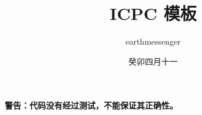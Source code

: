 \documentclass{article}
\title{ICPC 模板}
\author{earthmessenger}
\date{癸卯四月十一}
\begin{document}
\maketitle

\clearpage

\textbf{警告：代码没有经过测试，不能保证其正确性。}

\tableofcontents







\end{document}
